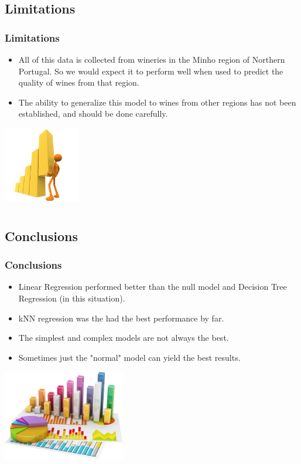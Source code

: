 \documentclass{beamer}
\begin{document}
		\subsection{Limitations}
	\begin{frame}
		\frametitle{Limitations}
		\begin{itemize}
			\item All of this data is collected from wineries in the Minho region of Northern Portugal.  So we would expect it to perform well when used to predict the quality of wines from that region.  
			\item The ability to generalize this model to wines from other regions has not been established, and should be done carefully.  
		\end{itemize}
		\vspace{15pt}
		\begin{center}
			\includegraphics[width=0.25\textwidth]{images/Limitations-of-statistics.jpg}
		\end{center}
	\end{frame}

	\section{}	
	\subsection{Conclusions}
	\begin{frame}
		\frametitle{Conclusions}
		\vspace{25pt}
			\begin{itemize}
			\item Linear Regression performed better than the null model and Decision Tree Regression (in this situation).  
			\item kNN regression was the had the best performance by far.
			\item The simplest and complex models are not always the best.  
			\item Sometimes just the "normal" model can yield the best results.  
		\end{itemize}
	\begin{center}
	\includegraphics[width=0.4\textwidth]{images/statistics-conclusion-first.jpg}
	\end{center}
	\end{frame}
\end{document}
